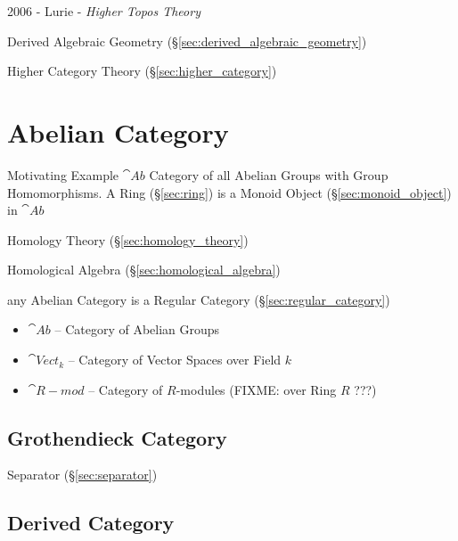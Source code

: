 2006 - Lurie - \emph{Higher Topos Theory}

\fist Derived Algebraic Geometry (\S\ref{sec:derived_algebraic_geometry})

\fist Higher Category Theory (\S\ref{sec:higher_category})



\section{Abelian Category}\label{sec:abelian_category}

Motivating Example $\cat{Ab}$ Category of all Abelian Groups with
Group Homomorphisms. A Ring (\S\ref{sec:ring}) is a Monoid Object
(\S\ref{sec:monoid_object}) in $\cat{Ab}$

Homology Theory (\S\ref{sec:homology_theory})

Homological Algebra (\S\ref{sec:homological_algebra})

any Abelian Category is a Regular Category
(\S\ref{sec:regular_category})

\begin{itemize}
  \item $\cat{Ab}$ -- Category of Abelian Groups
  \item $\cat{Vect}_k$ -- Category of Vector Spaces over Field $k$
  \item $\cat{R-mod}$ -- Category of $R$-modules (FIXME: over Ring $R$ ???)
\end{itemize}



\subsection{Grothendieck Category}\label{sec:grothendieck_category}

Separator (\S\ref{sec:separator})



\subsection{Derived Category}\label{sec:derived_category}

